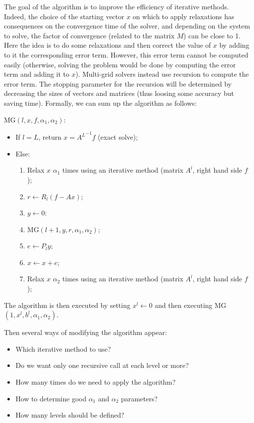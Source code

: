 \documentclass[10pt,conference]{IEEEtran}
\begin{document}
  The goal of the algorithm is to improve the efficiency of iterative methods. Indeed, the choice of the starting vector $x$ on which to apply relaxations has consequences on the convergence
  time of the solver, and depending on the system to solve, the factor of convergence (related to the matrix $M$) can be close to 1.\\
  Here the idea is to do some relaxations and then correct the value of $x$ by adding to it the corresponding error term. However, this error term cannot be computed easily (otherwise,
  solving the problem would be done by computing the error term and adding it to $x$). Multi-grid solvers instead use recursion to compute the error term. The stopping parameter for the
  recursion will be determined by decreasing the sizes of vectors and matrices (thus loosing some accuracy but saving time).
  Formally, we can sum up the algorithm as follows:
  
  MG$(l,x,f,\alpha_1,\alpha_2)$:
  \begin{itemize}
    \item If $l = L$, return $x = {A^L}^{-1} f$ (exact solve);
    \item Else:
    \begin{enumerate}
      \item Relax $x$ $\alpha_1$ times using an iterative method (matrix $A^l$, right hand side $f$);
      \item $r \leftarrow R_l ( f - Ax )$;
      \item $y \leftarrow 0$:
      \item MG$(l+1,y,r,\alpha_1,\alpha_2)$;
      \item $e \leftarrow P_{l} y$;
      \item $x \leftarrow x+e$;
      \item Relax $x$ $\alpha_2$ times using an iterative method (matrix $A^l$, right hand side $f$);
   \end{enumerate}
  \end{itemize}
  The algorithm is then executed by setting $x^l \leftarrow 0$ and then executing MG$(1,x^l,b^l,\alpha_1,\alpha_2)$.

  Then several ways of modifying the algorithm appear:
  \begin{itemize}
   \item Which iterative method to use?
   \item Do we want only one recursive call at each level or more?
   \item How many times do we need to apply the algorithm?
   \item How to determine good $\alpha_1$ and $\alpha_2$ parameters?
   \item How many levels should be defined?
  \end{itemize}
\end{document}

